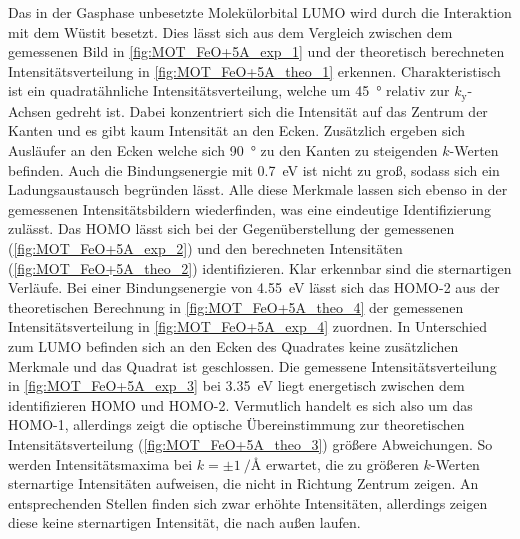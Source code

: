             Das in der Gasphase unbesetzte Molekülorbital LUMO wird durch die Interaktion mit dem Wüstit besetzt.
            Dies lässt sich aus dem Vergleich zwischen dem gemessenen Bild in \autoref{fig:MOT_FeO+5A_exp_1} und der theoretisch berechneten Intensitätsverteilung in \autoref{fig:MOT_FeO+5A_theo_1} erkennen.
            Charakteristisch ist ein quadratähnliche Intensitätsverteilung, welche um \SI{45}{\degree} relativ zur $k_\text{y}$-Achsen gedreht ist.
            Dabei konzentriert sich die Intensität auf das Zentrum der Kanten und es gibt kaum Intensität an den Ecken.
            Zusätzlich ergeben sich Ausläufer an den Ecken welche sich \SI{90}{\degree} zu den Kanten zu steigenden $k$-Werten befinden.
            Auch die Bindungsenergie mit \SI{0.7}{\electronvolt} ist nicht zu groß, sodass sich ein Ladungsaustausch begründen lässt.
            Alle diese Merkmale lassen sich ebenso in der gemessenen Intensitätsbildern wiederfinden, was eine eindeutige Identifizierung zulässt.
            Das HOMO lässt sich bei der Gegenüberstellung der gemessenen (\autoref{fig:MOT_FeO+5A_exp_2}) und den berechneten Intensitäten (\autoref{fig:MOT_FeO+5A_theo_2}) identifizieren.
            Klar erkennbar sind die sternartigen Verläufe. %
            Bei einer Bindungsenergie von \SI{4.55}{\electronvolt} lässt sich das HOMO-2 aus der theoretischen Berechnung in \autoref{fig:MOT_FeO+5A_theo_4} der gemessenen Intensitätsverteilung in \autoref{fig:MOT_FeO+5A_exp_4} zuordnen.
            In Unterschied zum LUMO befinden sich an den Ecken des Quadrates keine zusätzlichen Merkmale und das Quadrat ist geschlossen.
            Die gemessene Intensitätsverteilung in \autoref{fig:MOT_FeO+5A_exp_3} bei \SI{3.35}{\electronvolt} liegt energetisch zwischen dem identifizieren HOMO und HOMO-2.
            Vermutlich handelt es sich also um das HOMO-1, allerdings zeigt die optische Übereinstimmung zur theoretischen Intensitätsverteilung (\autoref{fig:MOT_FeO+5A_theo_3}) größere Abweichungen.
            So werden Intensitätsmaxima bei $k= \pm\SI[per-mode=reciprocal]{1}{\per\angstrom}$ erwartet, die zu größeren $k$-Werten sternartige Intensitäten aufweisen, die nicht in Richtung Zentrum zeigen.
            An entsprechenden Stellen finden sich zwar erhöhte Intensitäten, allerdings zeigen diese keine sternartigen Intensität, die nach außen laufen.
